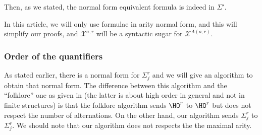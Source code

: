 \documentclass[a4paper,12pt]{article}
\newcommand{\sss}[1]{\subsubsection{#1}}
\theoremstyle{definition}
\newcommand{\hoa}[1]{\ensuremath{\HO^{#1}}}
\newcommand{\hob}[2]{\ensuremath{\Sigma^{#1}_{#2}}}
\newcommand{\mc}{\mathcal}
\begin{document}
Then, as we stated, the normal form equivalent formula is indeed in
$\Sigma'$.

In this article, we will only use formulae in arity normal form,
and this will simplify our proofs, and $\mc X^{a,r}$ will be a
syntactic sugar for $\mc X^{A(a,r)}$.

\sss{Order of the quantifiers}
\label{sec:normalform}
As stated earlier, there is a normal form for $\hob{r}{j}$ and we will
give an algorithm to obtain that normal form. The difference between
this algorithm and the ``folklore'' one as given in
\cite{lauri,Leivant94higherorder} (the latter is about high order in
general and not in finite structures) is that the folklore algorithm
sends $\hoa{r}$ to $\hoa{r}$ but does not respect the number of
alternations. On the other hand, our algorithm sends $\hob{r}{j}$ to
$\hob{r}{j}$. We should note that our algorithm does not respects the
the maximal arity.
\end{document}

